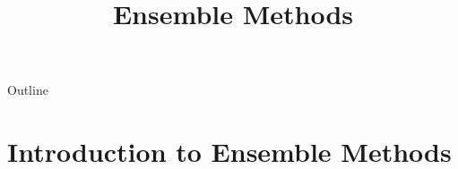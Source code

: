 

%
%
%

\title[Ensemble Methods]{Ensemble Methods}

%

\begin{frame}
  \titlepage
\end{frame}

\begin{frame}{Outline}
  \tableofcontents
\end{frame}

\section{Introduction to Ensemble Methods}

